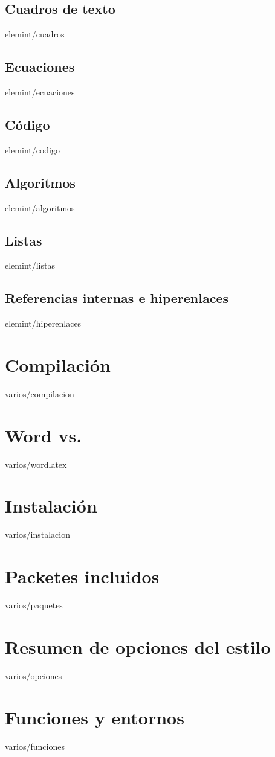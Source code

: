 \documentclass[epsbased,copyright,final,printable,covers,extendedindex,firstnumbered,tfg,gnuplot]{tfgtfmthesisuam}
\begin{document}
  \section{Cuadros de texto\label{SEC:CUADROS}}{elemint/cuadros}
  \section{Ecuaciones\label{SEC:ECUACIONES}}{elemint/ecuaciones}
  \section{Código\label{SEC:CODIGO}}{elemint/codigo}
  \section{Algoritmos\label{SEC:ALGORITMOS}}{elemint/algoritmos}
  \section{Listas\label{SEC:LISTAS}}{elemint/listas}
  \section{Referencias internas e hiperenlaces\label{SEC:HIPERENLACES}}{elemint/hiperenlaces}
\chapter{Compilación\label{CAP:COMPILACION}}{varios/compilacion}

\appendix

\chapter{Word\textsuperscript{\textregistered} vs. \LaTeXe\label{CAP:WORDLATEX}}{varios/wordlatex}
\chapter{Instalación\label{CAP:INSTALACION}}{varios/instalacion}
\chapter{Packetes incluidos\label{CAP:PAQUETES}}{varios/paquetes}
\chapter{Resumen de opciones del estilo\label{CAP:OPCIONES}}{varios/opciones}
\chapter{Funciones y entornos\label{CAP:FUNCENT}}{varios/funciones}
\end{document}
